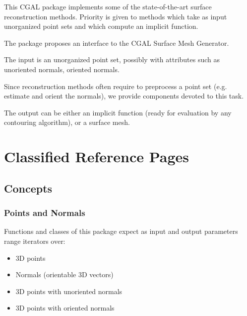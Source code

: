 



This CGAL package implements some of the state-of-the-art surface
reconstruction methods. Priority is given to methods
which take as input unorganized point sets and
which compute an implicit function.

The package proposes an interface to the CGAL Surface Mesh Generator.

The input is an unorganized point set, possibly with attributes
such as unoriented normals, oriented normals.

Since reconstruction methods often require to preprocess a point set
(e.g. estimate and orient the normals), we provide components devoted
to this task.

The output can be either an implicit function (ready for evaluation
by any contouring algorithm), or a surface mesh.


\section{Classified Reference Pages}


\subsection{Concepts}

\subsubsection{Points and Normals}

Functions and classes of this package expect as input and output parameters range iterators over:

\begin{itemize}
\item 3D points
\item Normals (orientable 3D vectors)
\item 3D points with unoriented normals
\item 3D points with oriented normals
\end{itemize}

